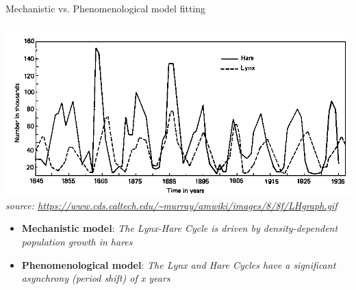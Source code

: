 \documentclass[xcolor=x11names,compress]{beamer}
\renewcommand{\(}{\begin{columns}}
\renewcommand{\)}{\end{columns}}
\newcommand{\<}[1]{\begin{column}{#1}}
\renewcommand{\>}{\end{column}}
\begin{document}
\begin{frame}{Mechanistic vs. Phenomenological model fitting}

\begin{center}
		\includegraphics[width=.7\textwidth]{graphics/L-H_cycle.png}\\
		{\it \tiny source: \url{https://www.cds.caltech.edu/~murray/amwiki/images/8/8f/LHgraph.gif}}
\end{center}
\pause
\begin{itemize}[<+->] \itemsep6pt

	\item {\bf Mechanistic model}: \it The Lynx-Hare Cycle is driven by density-dependent population growth in hares

	\item {\bf Phenomenological model}: \it The Lynx and Hare Cycles have a significant asynchrony (period shift) of x years

\end{itemize}

 \end{frame}
 
\end{document}
